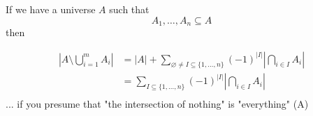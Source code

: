 If we have a universe $A$ such that
\[
  A_1,\ldots,A_n \subseteq A
\]then

\begin{align*}
  |A\setminus \bigcup\limits_{i=1}^m A_i| &=
  |A| + \sum_{\varnothing\neq I\subseteq\{1,\ldots,n\}}
    (-1)^{|I|}
    \left| \bigcap_{i\in I} A_i \right| \\
  &= \sum_{I\subseteq\{1,\ldots,n\}}
    (-1)^{|I|}
    \left| \bigcap_{i\in I} A_i \right| \\
\end{align*}
... if you presume that "the intersection of nothing" is "everything" (A)


